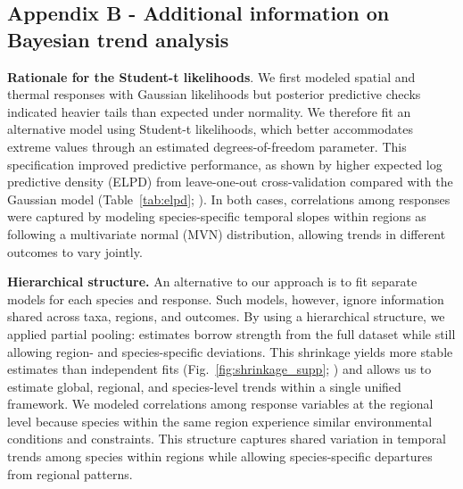 \documentclass[pdflatex,sn-nature,referee]{sn-jnl}%
\begin{document}
\begin{bibunit}

\subsection*{Appendix B - Additional information on Bayesian trend analysis}\label{sec:B}

\noindent
\textbf{Rationale for the Student-t likelihoods}.
We first modeled spatial and thermal responses with Gaussian likelihoods but posterior predictive checks indicated heavier tails than expected under normality. We therefore fit an alternative model using Student-t likelihoods, which better accommodates extreme values through an estimated degrees-of-freedom parameter. This specification improved predictive performance, as shown by higher expected log predictive density (ELPD) from leave-one-out cross-validation compared with the Gaussian model (Table~\ref{tab:elpd}; \citep{VehtariLOO2017}). In both cases, correlations among responses were captured by modeling species-specific temporal slopes within regions as following a multivariate normal (MVN) distribution, allowing trends in different outcomes to vary jointly.

\begin{table}[!htbp]
\centering
    \caption{Expected log predictive density (ELPD) differences between models. ELPD differences are reported relative to the best-performing model, which is assigned a value of zero. Negative values indicate poorer expected out-of-sample predictive performance. SE denotes the standard error of the ELPD difference}
    \label{tab:elpd}

\end{table}

\noindent
\textbf{Hierarchical structure.} 
An alternative to our approach is to fit separate models for each species and response. Such models, however, ignore information shared across taxa, regions, and outcomes. By using a hierarchical structure, we applied partial pooling: estimates borrow strength from the full dataset while still allowing region- and species-specific deviations. This shrinkage yields more stable estimates than independent fits (Fig.~\ref{fig:shrinkage_supp}; \citep{McElreath2018}) and allows us to estimate global, regional, and species-level trends within a single unified framework. We modeled correlations among response variables at the regional level because species within the same region experience similar environmental conditions and constraints. This structure captures shared variation in temporal trends among species within regions while allowing species-specific departures from regional patterns.


\end{bibunit}
\end{document}
